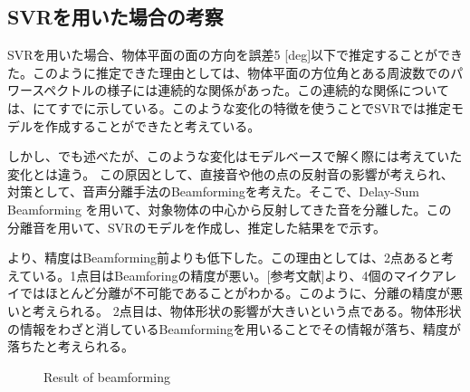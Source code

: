 \clearpage

\subsection{SVRを用いた場合の考察}
SVRを用いた場合、物体平面の面の方向を誤差5 [deg]以下で推定することができた。このように推定できた理由としては、物体平面の方位角とある周波数でのパワースペクトルの様子には連続的な関係があった。この連続的な関係については、にてすでに示している。このような変化の特徴を使うことでSVRでは推定モデルを作成することができたと考えている。

しかし、でも述べたが、このような変化はモデルベースで解く際には考えていた変化とは違う。
この原因として、直接音や他の点の反射音の影響が考えられ、対策として、音声分離手法のBeamformingを考えた。そこで、Delay-Sum Beamforming を用いて、対象物体の中心から反射してきた音を分離した。この分離音を用いて、SVRのモデルを作成し、推定した結果をで示す。

より、精度はBeamforming前よりも低下した。この理由としては、2点あると考えている。1点目はBeamforingの精度が悪い。[参考文献]より、4個のマイクアレイではほとんど分離が不可能であることがわかる。このように、分離の精度が悪いと考えられる。
2点目は、物体形状の影響が大きいという点である。物体形状の情報をわざと消しているBeamformingを用いることでその情報が落ち、精度が落ちたと考えられる。

\begin{figure}[ht]
    \centering
    \caption{Result of beamforming}
    \label{fig:beam_check}
\end{figure}
\fi

